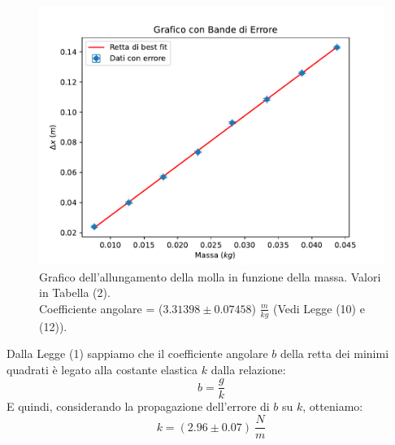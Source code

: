 \documentclass[11pt]{article}
\begin{document}
\begin{figure}[H]
  \centering
  \includegraphics[width=1\textwidth]{grafico1p1.pdf}
  \caption{Grafico dell'allungamento della molla in funzione della massa. Valori in Tabella (2). \\
    Coefficiente angolare = ($3.31398\pm 0.07458$) $\frac{m}{kg}$ (Vedi Legge (10) e (12)).}
\end{figure}
Dalla Legge (1) sappiamo che il coefficiente angolare $b$ della retta dei minimi quadrati è legato alla costante elastica $k$ dalla relazione:
\begin{equation}
    b=\frac{g}{k}
\end{equation}
E quindi, considerando la propagazione dell'errore di $b$ su $k$, otteniamo:
\begin{equation}
    k = (2.96 \pm 0.07)\ \frac{N}{m} 
\end{equation}
\end{document}
